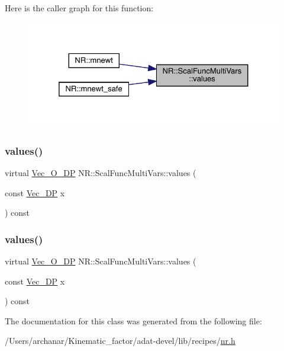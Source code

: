 Here is the caller graph for this function\+:
\nopagebreak
\begin{figure}[H]
\begin{center}
\leavevmode
\includegraphics[width=325pt]{d5/d17/classNR_1_1ScalFuncMultiVars_a5345ed027a649e71ae8ae3c8dadb436c_icgraph}
\end{center}
\end{figure}
\mbox{\label{classNR_1_1ScalFuncMultiVars_a5345ed027a649e71ae8ae3c8dadb436c}} 
\subsubsection{\texorpdfstring{values()}{values()}\hspace{0.1cm}{\footnotesize\ttfamily [2/3]}}
{\footnotesize\ttfamily virtual \mbox{\hyperlink{namespaceNR_a970094d23441f8ef6a45282a7eb2103d}{Vec\+\_\+\+O\+\_\+\+DP}} N\+R\+::\+Scal\+Func\+Multi\+Vars\+::values (\begin{DoxyParamCaption}\item[{const \mbox{\hyperlink{namespaceNR_a115a3196718c98e8e2562d80b06c23c5}{Vec\+\_\+\+DP}}}]{x }\end{DoxyParamCaption}) const\hspace{0.3cm}{\ttfamily [pure virtual]}}

\mbox{\label{classNR_1_1ScalFuncMultiVars_a5345ed027a649e71ae8ae3c8dadb436c}} 
\subsubsection{\texorpdfstring{values()}{values()}\hspace{0.1cm}{\footnotesize\ttfamily [3/3]}}
{\footnotesize\ttfamily virtual \mbox{\hyperlink{namespaceNR_a970094d23441f8ef6a45282a7eb2103d}{Vec\+\_\+\+O\+\_\+\+DP}} N\+R\+::\+Scal\+Func\+Multi\+Vars\+::values (\begin{DoxyParamCaption}\item[{const \mbox{\hyperlink{namespaceNR_a115a3196718c98e8e2562d80b06c23c5}{Vec\+\_\+\+DP}}}]{x }\end{DoxyParamCaption}) const\hspace{0.3cm}{\ttfamily [pure virtual]}}



The documentation for this class was generated from the following file\+:\begin{DoxyCompactItemize}
\item 
/\+Users/archanar/\+Kinematic\+\_\+factor/adat-\/devel/lib/recipes/\mbox{\hyperlink{adat-devel_2lib_2recipes_2nr_8h}{nr.\+h}}\end{DoxyCompactItemize}
